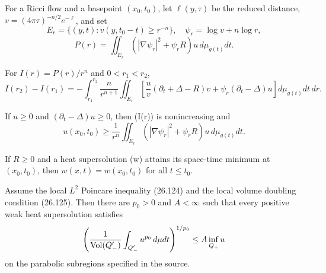 For a Ricci flow and a basepoint \((x_0,t_0)\), let \(\ell(y,\tau)\) be the
reduced distance, \(v=(4\pi\tau)^{-n/2}e^{-\ell}\), and set
\[
 E_r=\{(y,t):v(y,t_0-t)\ge r^{-n}\},\quad
 \psi_r=\log v+n\log r,
\]
\[
 P(r)=\iint_{E_r}(|\nabla\psi_r|^2+\psi_rR)u\,d\mu_{g(t)}dt.
\]

\begin{theorem}
\label{thm:chow-iii-ricci-flow-local-mean-value-monotonicity}

For \(I(r)=P(r)/r^n\) and \(0<r_1<r_2\),
\[
 I(r_2)-I(r_1)=-\int_{r_1}^{r_2}\frac n{r^{n+1}}
 \iint_{E_r}\left[
 \frac uv(\partial_t+\Delta-R)v+\psi_r(\partial_t-\Delta)u
 \right]d\mu_{g(t)}dt\,dr.
\]
\end{theorem}

\begin{corollary}
\label{cor:chow-iii-ricci-flow-supersolution-mean-value}


If \(u\ge0\) and \((\partial_t-\Delta)u\ge0\), then (I(r)) is
nonincreasing and
\[
 u(x_0,t_0)\ge\frac1{r^n}\iint_{E_r}
 (|\nabla\psi_r|^2+\psi_rR)u\,d\mu_{g(t)}dt.
\]
\end{corollary}

\begin{corollary}
\label{cor:chow-iii-ricci-flow-strong-maximum-principle}


If \(R\ge0\) and a heat supersolution (w) attains its space-time minimum at
\((x_0,t_0)\), then \(w(x,t)=w(x_0,t_0)\) for all \(t\le t_0\).
\end{corollary}

\begin{theorem}
\label{thm:chow-iii-weak-parabolic-harnack-inequality}

Assume the local \(L^2\) Poincare inequality (26.124) and the local volume
doubling condition (26.125).  Then there are \(p_0>0\) and \(A<\infty\)
such that every positive weak heat supersolution satisfies
\[
 \left(\frac1{\operatorname{Vol}(Q'_-)}\int_{Q'_-}u^{p_0}\,d\mu dt\right)^{1/p_0}
 \le A\inf_{Q_+}u
\]
on the parabolic subregions specified in the source.
\end{theorem}

